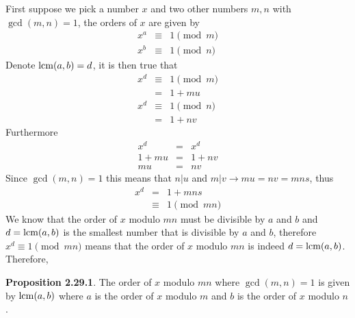 \documentclass[aps,preprint,preprintnumbers,nofootinbib,showpacs,prd]{revtex4-1}
\newcommand{\nbea}{\begin{eqnarray*}}
\newcommand{\neea}{\end{eqnarray*}}
\begin{document}
First suppose we pick a number $x$ and two other numbers $m,n$ with $\gcd(m,n) = 1$, the orders of $x$ are given by
%
\nbea
x^a & \equiv & 1 \pmod{m} \\
x^b & \equiv & 1 \pmod{n}
\neea
%
Denote ${\rm lcm}(a,b) = d$, it is then true that
%
\nbea
x^d &\equiv & 1 \pmod{m} \\
& = & 1 + mu\\
x^d & \equiv & 1 \pmod{n} \\
& = & 1 + nv
\neea
%
Furthermore
%
\nbea
x^d & = & x^d \\
1 + mu & = & 1 +nv \\
mu & = & nv
\neea
%
Since $\gcd(m,n)=1$ this means that $n|u$ and $m|v \to mu=nv = mns$, thus
%
\nbea
x^d & = & 1 + mn s \\
& \equiv & 1 \pmod{mn}
\neea
%
We know that the order of $x$ modulo $mn$ must be divisible by $a$ and $b$ and $d = {\rm lcm}(a,b)$ is the smallest number that is divisible by $a$ and $b$, therefore $x^d \equiv 1 \pmod{mn}$ means that the order of $x$ modulo $mn$ is indeed $d = {\rm lcm}(a,b)$. Therefore,

{\bf Proposition 2.29.1}. The order of $x$ modulo $mn$ where $\gcd(m,n) = 1$ is given by ${\rm lcm}(a,b)$ where $a$ is the order of $x$ modulo $m$ and $b$ is the order of $x$ modulo $n$.
\end{document}
